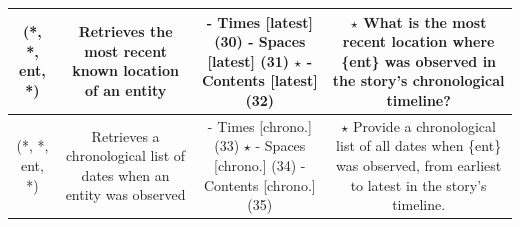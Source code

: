 \begin{table}[ht]
{{\begin{tabular}{cccc}
    \midrule
    (*, *, ent, *) & \parbox[c]{\lenD}{\centering Retrieves the most recent known location of an entity} &
    \parbox[c]{\lenT}{- Times [latest] (30) \\ - Spaces [latest] (31) \(\star\) \\ - Contents [latest] (32)}& 
    \parbox[c]{\lenQ}{\(\star\) What is the most recent location where \{ent\} was observed in the story's chronological timeline? } \\
    \midrule
    (*, *, ent, *) &  \parbox[c]{\lenD}{\centering Retrieves a chronological list of dates when an entity was observed} &
    \parbox[c]{\lenT}{- Times [chrono.] (33) \(\star\) \\ - Spaces [chrono.] (34) \\ - Contents [chrono.] (35)}& 
    \parbox[c]{\lenQ}{\(\star\) Provide a chronological list of all dates when \{ent\} was observed, from earliest to latest in the story's timeline. } \\
    \bottomrule
    \end{tabular}
    }}\vspace{-0.3cm}
    \end{table}
